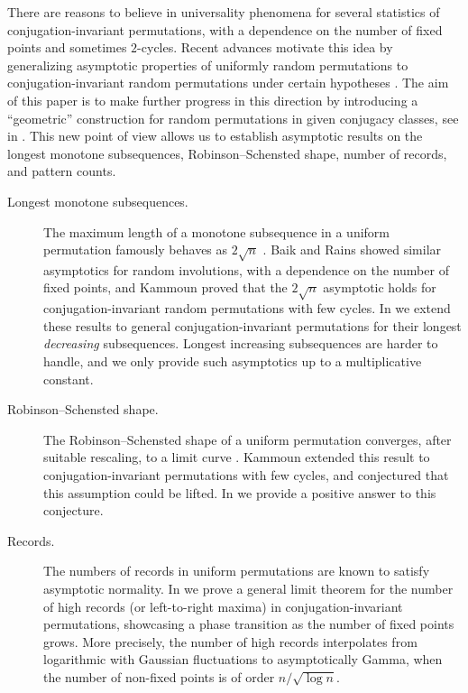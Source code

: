 \documentclass{article}
\theoremstyle{remark}
\begin{document}
There are reasons to believe in universality phenomena for several statistics of conjugation-invariant permutations, with a dependence on the number of fixed points and sometimes $2$-cycles.
Recent advances motivate this idea by generalizing asymptotic properties of uniformly random permutations to conjugation-invariant random permutations under certain hypotheses \cite{F13,FKL22,HR22,K18}.
The aim of this paper is to make further progress in this direction by introducing a ``geometric'' construction for random permutations in given conjugacy classes, see  in .
This new point of view allows us to establish asymptotic results on the longest monotone subsequences, Robinson--Schensted shape, number of records, and pattern counts.

\begin{description}
    \item[Longest monotone subsequences.] The maximum length of a monotone subsequence in a uniform permutation famously behaves as $2\sqrt n$ \cite{VK77}.
    Baik and Rains \cite{BR01} showed similar asymptotics for random involutions, with a dependence on the number of fixed points, and Kammoun \cite{K18} proved that the $2\sqrt n$ asymptotic holds for conjugation-invariant random permutations with few cycles.
    In  we extend these results to general conjugation-invariant permutations for their longest {\em decreasing} subsequences.
    Longest increasing subsequences are harder to handle, and we only provide such asymptotics up to a multiplicative constant.
    \item[Robinson--Schensted shape.] The Robinson--Schensted shape of a uniform permutation converges, after suitable rescaling, to a limit curve \cite{LS77,VK77}.
    Kammoun \cite{K18} extended this result to conjugation-invariant permutations with few cycles, and conjectured that this assumption could be lifted.
    In  we provide a positive answer to this conjecture.
    \item[Records.] The numbers of records in uniform permutations are known to satisfy asymptotic normality.
    In  we prove a general limit theorem for the number of high records (or left-to-right maxima) in conjugation-invariant permutations, showcasing a phase transition as the number of fixed points grows.
    More precisely, the number of high records interpolates from logarithmic with Gaussian fluctuations to asymptotically Gamma, when the number of non-fixed points is of order $n/\sqrt{\log n}$.

\end{description}
\end{document}
